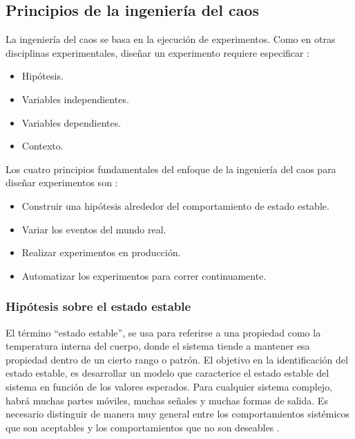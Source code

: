 \subsection{Principios de la ingeniería del caos}
\par La ingeniería del caos se basa en la ejecución de experimentos. Como en otras disciplinas experimentales, diseñar un experimento requiere especificar \cite{LIB02}:
\begin{itemize}
    \item Hipótesis.
    \item Variables independientes.
    \item Variables dependientes.
    \item Contexto.
\end{itemize}

\par Los cuatro principios fundamentales del enfoque de la ingeniería del caos para diseñar experimentos son \cite{LIB02}:
\begin{itemize}
    \item Construir una hipótesis alrededor del comportamiento de estado estable.
    \item Variar los eventos del mundo real.
    \item Realizar experimentos en producción.
    \item Automatizar los experimentos para correr continuamente.
\end{itemize}

\subsubsection{Hipótesis sobre el estado estable}

\par El término ``estado estable'', se usa para referirse a una propiedad como la temperatura interna del cuerpo, donde el sistema tiende a mantener esa propiedad dentro de un cierto rango o patrón. El objetivo en la identificación del estado estable, es desarrollar un modelo que caracterice el estado estable del sistema en función de los valores esperados. Para cualquier sistema complejo, habrá muchas partes móviles, muchas señales y muchas formas de salida. Es necesario distinguir de manera muy general entre los comportamientos sistémicos que son aceptables y los comportamientos que no son deseables \cite{LIB06}.\\

